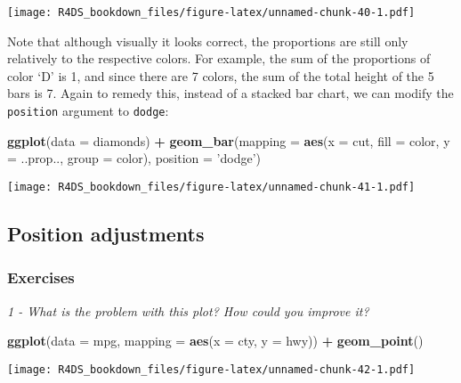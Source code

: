 \documentclass[]{article}
\newenvironment{Shaded}{\begin{snugshade}}{\end{snugshade}}
\newcommand{\KeywordTok}[1]{\textcolor[rgb]{0.13,0.29,0.53}{\textbf{#1}}}
\newcommand{\DataTypeTok}[1]{\textcolor[rgb]{0.13,0.29,0.53}{#1}}
\newcommand{\StringTok}[1]{\textcolor[rgb]{0.31,0.60,0.02}{#1}}
\newcommand{\OperatorTok}[1]{\textcolor[rgb]{0.81,0.36,0.00}{\textbf{#1}}}
\newcommand{\NormalTok}[1]{#1}
\theoremstyle{definition}
\theoremstyle{definition}
\theoremstyle{definition}
\theoremstyle{remark}
\begin{document}
\texttt{[image: R4DS\_bookdown\_files/figure-latex/unnamed-chunk-40-1.pdf]}

Note that although visually it looks correct, the proportions are still
only relatively to the respective colors. For example, the sum of the
proportions of color `D' is 1, and since there are 7 colors, the sum of
the total height of the 5 bars is 7. Again to remedy this, instead of a
stacked bar chart, we can modify the \texttt{position} argument to
\texttt{dodge}:

\begin{Shaded}
\begin{Highlighting}[]
\KeywordTok{ggplot}\NormalTok{(}\DataTypeTok{data =}\NormalTok{ diamonds) }\OperatorTok{+}\StringTok{ }
\StringTok{  }\KeywordTok{geom_bar}\NormalTok{(}\DataTypeTok{mapping =} \KeywordTok{aes}\NormalTok{(}\DataTypeTok{x =}\NormalTok{ cut, }\DataTypeTok{fill =}\NormalTok{ color, }\DataTypeTok{y =}\NormalTok{ ..prop.., }\DataTypeTok{group =}\NormalTok{ color),}
           \DataTypeTok{position =} \StringTok{'dodge'}\NormalTok{)}
\end{Highlighting}
\end{Shaded}

\texttt{[image: R4DS\_bookdown\_files/figure-latex/unnamed-chunk-41-1.pdf]}

\subsection{Position adjustments}\label{position-adjustments}

\subsubsection{Exercises}\label{exercises-5}

\emph{1 - What is the problem with this plot? How could you improve it?}

\begin{Shaded}
\begin{Highlighting}[]
\KeywordTok{ggplot}\NormalTok{(}\DataTypeTok{data =}\NormalTok{ mpg, }\DataTypeTok{mapping =} \KeywordTok{aes}\NormalTok{(}\DataTypeTok{x =}\NormalTok{ cty, }\DataTypeTok{y =}\NormalTok{ hwy)) }\OperatorTok{+}\StringTok{ }
\StringTok{  }\KeywordTok{geom_point}\NormalTok{()}
\end{Highlighting}
\end{Shaded}

\texttt{[image: R4DS\_bookdown\_files/figure-latex/unnamed-chunk-42-1.pdf]}
\end{document}

